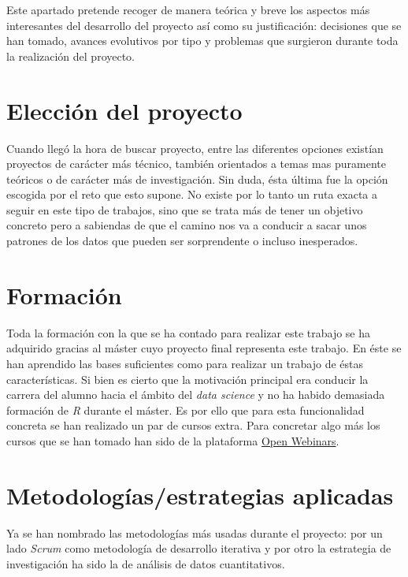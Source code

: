 
Este apartado pretende recoger de manera teórica y breve los aspectos más interesantes del desarrollo del proyecto así como su justificación: decisiones que se han tomado, avances evolutivos por tipo y problemas que surgieron durante toda la realización del proyecto.


\section{Elección del proyecto}\label{inicio-proyecto}
Cuando llegó la hora de buscar proyecto, entre las diferentes opciones existían proyectos de carácter más técnico, también orientados a temas mas puramente teóricos o de carácter más de investigación. Sin duda, ésta última fue la opción escogida por el reto que esto supone. No existe por lo tanto un ruta exacta a seguir en este tipo de trabajos, sino que se trata más de tener un objetivo concreto pero a sabiendas de que el camino nos va a conducir a sacar unos patrones de los datos que pueden ser sorprendente o incluso inesperados. 

\section{Formación}\label{formacion}

Toda la formación con la que se ha contado para realizar este trabajo se ha adquirido gracias al máster cuyo proyecto final representa este trabajo. En éste se han aprendido las bases suficientes como para realizar un trabajo de éstas características. Si bien es cierto que la motivación principal era conducir la carrera del alumno hacia el ámbito del \textit{data science} y no ha habido demasiada formación de \textit{R} durante el máster. Es por ello que para esta funcionalidad concreta se han realizado un par de cursos extra. Para concretar algo más los cursos que se han tomado han sido de la plataforma \href{https://openwebinars.net/}{Open Webinars}.

\section{Metodologías/estrategias aplicadas}\label{metodologia}

Ya se han nombrado las metodologías más usadas durante el proyecto: por un lado \textit{Scrum} como metodología de desarrollo iterativa y por otro la estrategia de investigación ha sido la de análisis de datos cuantitativos. 

